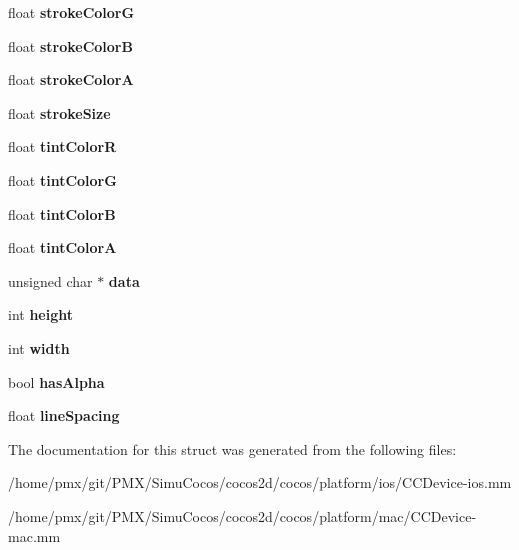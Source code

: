 \begin{DoxyCompactItemize}
float {\bfseries stroke\+ColorG}
\item 
\mbox{\label{structtImageInfo_a38cbd9c022a7b09267447e959586d791}} 
float {\bfseries stroke\+ColorB}
\item 
\mbox{\label{structtImageInfo_a406b1f2b1d92c1b8420c462beb1a2819}} 
float {\bfseries stroke\+ColorA}
\item 
\mbox{\label{structtImageInfo_a5d0dae896e1ac557a65bf3405f2fc114}} 
float {\bfseries stroke\+Size}
\item 
\mbox{\label{structtImageInfo_a6c630e9c94eeeb04b9743c4160896e18}} 
float {\bfseries tint\+ColorR}
\item 
\mbox{\label{structtImageInfo_a3f9be7383b6d0ece30da8fade9a671ef}} 
float {\bfseries tint\+ColorG}
\item 
\mbox{\label{structtImageInfo_adcb746d84f156cb706c6b95dff7e5444}} 
float {\bfseries tint\+ColorB}
\item 
\mbox{\label{structtImageInfo_a1c1c3c1f4b9c4132c1c0c10190890c6c}} 
float {\bfseries tint\+ColorA}
\item 
\mbox{\label{structtImageInfo_a76750ba6103729d324e89727474c4906}} 
unsigned char $\ast$ {\bfseries data}
\item 
\mbox{\label{structtImageInfo_a7b527b1c9a9db7bb7757a8a47b3b6745}} 
int {\bfseries height}
\item 
\mbox{\label{structtImageInfo_a5af13cd212d07ee3831da08504d79914}} 
int {\bfseries width}
\item 
\mbox{\label{structtImageInfo_a939271527238c8cb98c90af08896b853}} 
bool {\bfseries has\+Alpha}
\item 
\mbox{\label{structtImageInfo_a5844215a19b505bc75b2cd8755c30abe}} 
float {\bfseries line\+Spacing}
\end{DoxyCompactItemize}


The documentation for this struct was generated from the following files\+:\begin{DoxyCompactItemize}
\item 
/home/pmx/git/\+P\+M\+X/\+Simu\+Cocos/cocos2d/cocos/platform/ios/C\+C\+Device-\/ios.\+mm\item 
/home/pmx/git/\+P\+M\+X/\+Simu\+Cocos/cocos2d/cocos/platform/mac/C\+C\+Device-\/mac.\+mm\end{DoxyCompactItemize}
